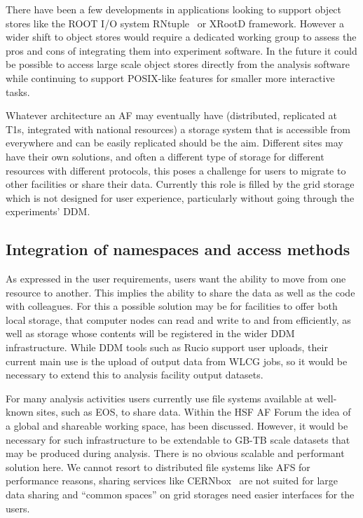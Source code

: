 There have been a few developments in applications looking to support object stores like the ROOT I/O system RNtuple~\cite{rntuple} or XRootD framework. However a wider shift to object stores would require a dedicated working group to assess the pros and cons of integrating them into experiment software. In the future it could be possible to access large scale object stores directly from the analysis software while continuing to support POSIX-like features for smaller more interactive tasks. 

Whatever architecture an AF may eventually have (distributed, replicated at T1s, integrated with national resources) a storage system that is accessible from everywhere and can be easily replicated should be the aim. Different sites may have their own solutions, and often a different type of storage for different resources with different protocols, this poses a challenge for users to migrate to other facilities or share their data. Currently this role is filled by the grid storage which is not designed for user experience, particularly without going through the experiments’ DDM.

\subsection*{Integration of namespaces and access methods}

As expressed in the user requirements, users want the ability to move from one resource to another. This implies the ability to share the data as well as the code with colleagues. For this   a possible solution may be for facilities to offer both local storage, that computer nodes can read and write to and from efficiently, as well as storage whose contents will be registered in the wider DDM infrastructure. While DDM tools such as Rucio support user uploads, their current main use is the upload of output data from WLCG jobs, so it would be necessary to extend this to analysis facility output datasets. 

For many analysis activities users currently use file systems available at well-known sites, such as EOS, to share data. Within the HSF AF Forum the idea of a global and shareable working space, has been discussed. However, it would be necessary for such infrastructure to be extendable to GB-TB scale datasets that may be produced during analysis. There is no obvious scalable and performant solution here. We cannot resort to distributed file systems like AFS for performance reasons, sharing services like CERNbox~\cite{cernbox} are not suited for large data sharing  and “common spaces” on grid storages need easier interfaces for the users.

